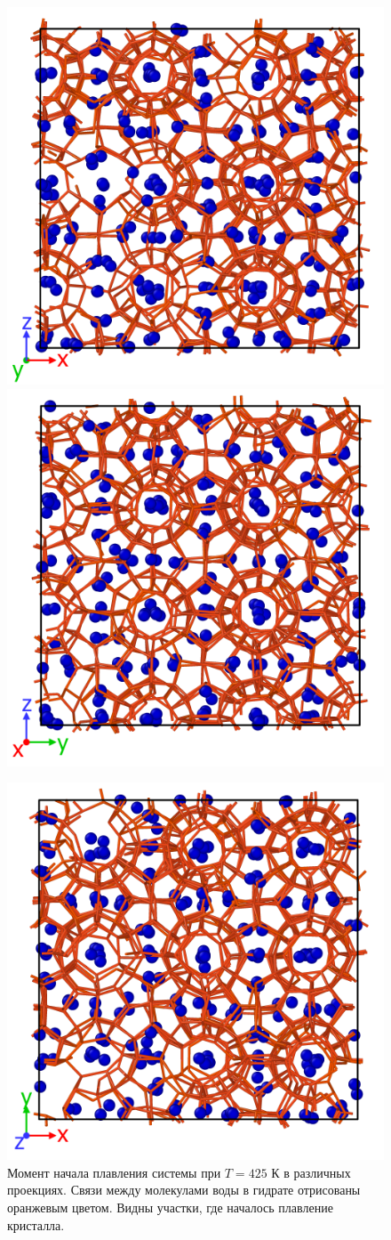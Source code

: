 \begin{figure}[H]
    \centering
    \begin{minipage}{\linewidth}
        \includegraphics[width=.45\linewidth]{figures/tip4p_melt1.png}
        \includegraphics[width=.45\linewidth]{figures/tip4p_melt2.png}
    \end{minipage}
    \begin{minipage}{\linewidth}
        \centering
        \includegraphics[width=.45\linewidth]{figures/tip4p_melt3.png}
    \end{minipage}
    \caption{Момент начала плавления системы при $T=425$ К в различных проекциях. Связи между молекулами воды в гидрате отрисованы оранжевым цветом. Видны участки, где началось плавление кристалла.}
    \label{fig3.10}
\end{figure}



